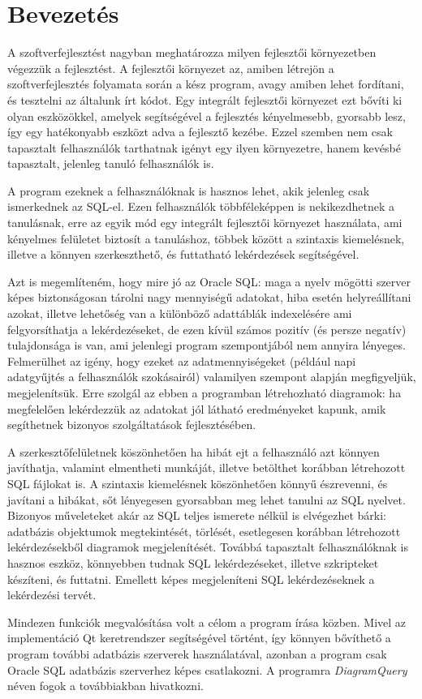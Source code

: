 \chapter{Bevezetés}

A szoftverfejlesztést nagyban meghatározza milyen fejlesztői környezetben végezzük a fejlesztést. A fejlesztői
környezet az, amiben létrejön a szoftverfejlesztés folyamata során a kész program, avagy amiben
lehet fordítani, és tesztelni az általunk írt kódot. Egy integrált fejlesztői környezet ezt bővíti
ki olyan eszközökkel, amelyek segítségével a fejlesztés kényelmesebb, gyorsabb lesz, így egy
hatékonyabb eszközt adva a fejlesztő kezébe. Ezzel szemben nem csak tapasztalt felhasználók tarthatnak igényt
egy ilyen környezetre, hanem kevésbé tapasztalt, jelenleg tanuló felhasználók is.

A program ezeknek a felhasználóknak is hasznos lehet, akik jelenleg csak ismerkednek az SQL-el. 
Ezen felhasználók többféleképpen is nekikezdhetnek a tanulásnak, erre az
egyik mód egy integrált fejlesztői környezet használata, ami kényelmes
felületet biztosít a tanuláshoz, többek között a szintaxis kiemelésnek,
illetve a könnyen szerkeszthető, és futtatható lekérdezések segítségével.

Azt is megemlíteném, hogy mire jó az Oracle SQL: maga a nyelv mögötti szerver képes biztonságosan tárolni nagy
mennyiségű adatokat, hiba esetén helyreállítani azokat, illetve lehetőség van a különböző adattáblák indexelésére
ami felgyorsíthatja a lekérdezéseket, de ezen kívül számos pozitív (és persze negatív) tulajdonsága is van,
ami jelenlegi program szempontjából nem annyira lényeges. Felmerülhet az igény, hogy ezeket az adatmennyiségeket
(például napi adatgyűjtés a felhasználók szokásairól) valamilyen szempont alapján megfigyeljük, megjelenítsük.
Erre szolgál az ebben a programban létrehozható diagramok: ha megfelelően lekérdezzük az adatokat jól látható
eredményeket kapunk, amik segíthetnek bizonyos szolgáltatások fejlesztésében.

A szerkesztőfelületnek köszönhetően ha hibát ejt a felhasználó azt könnyen
javíthatja, valamint elmentheti munkáját, illetve betölthet korábban létrehozott
SQL fájlokat is. A szintaxis kiemelésnek köszönhetően könnyű észrevenni,
és javítani a hibákat, sőt lényegesen gyorsabban meg lehet tanulni az SQL
nyelvet. Bizonyos műveleteket akár az SQL teljes ismerete nélkül is elvégezhet bárki:
adatbázis objektumok megtekintését, törlését, esetlegesen korábban létrehozott lekérdezésekből
diagramok megjelenítését.
Továbbá tapasztalt felhasználóknak is hasznos eszköz, könnyebben tudnak SQL
lekérdezéseket, illetve szkripteket készíteni, és futtatni. Emellett képes megjeleníteni
SQL lekérdezéseknek a lekérdezési tervét.

Mindezen funkciók megvalósítása volt a célom a program írása közben. Mivel az
implementáció Qt keretrendszer segítségével történt, így könnyen bővíthető a program további adatbázis szerverek
használatával, azonban a program csak Oracle SQL adatbázis szerverhez képes csatlakozni.
A programra \textit{DiagramQuery} néven fogok a továbbiakban hivatkozni.
